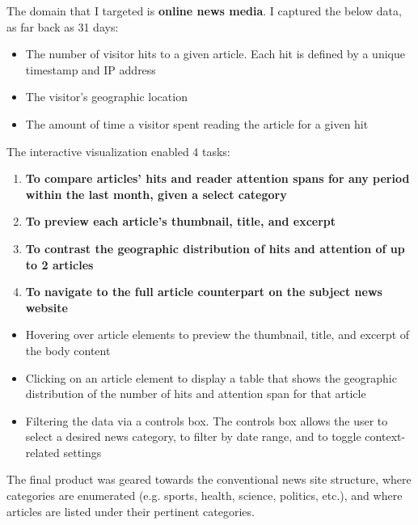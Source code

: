\documentclass[12pt]{article}
\begin{document}
The domain that I targeted is \textbf{online news media}. I captured the below data, as far back as 31 days:
\begin{itemize}
\item The number of visitor hits to a given article. Each hit is defined by a unique timestamp and IP address
\item The visitor's geographic location
\item The amount of time a visitor spent reading the article for a given hit
\end{itemize}

\newpage

\noindent The interactive visualization enabled 4 tasks:
\begin{enumerate}
\item \textbf{To compare articles' hits and reader attention spans for any period within the last month, given a select category}
\item \textbf{To preview each article's thumbnail, title, and excerpt}
\item \textbf{To contrast the geographic distribution of hits and attention of up to 2 articles}
\item \textbf{To navigate to the full article counterpart on the subject news website}
\end{enumerate}

\begin{itemize}
\item Hovering over article elements to preview the thumbnail, title, and excerpt of the body content
\item Clicking on an article element to display a table that shows the geographic distribution of the number of hits and attention span for that article
\item Filtering the data via a controls box. The controls box allows the user to select a desired news category, to filter by date range, and to toggle context-related settings 
\end{itemize}

The final product was geared towards the conventional news site structure, where categories are enumerated (e.g. sports, health, science, politics, etc.), and where articles are listed under their pertinent categories. \\
\end{document}
